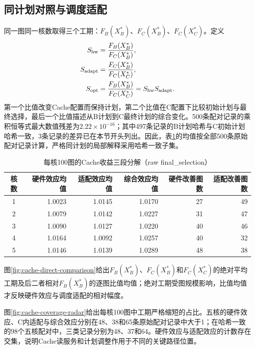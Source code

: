 \subsection{同计划对照与调度适配}
同一图同一核数取得三个工期：$F_B(X_B^*)$、$F_C(X_B^*)$、$F_C(X_C^*)$。定义
\begin{equation}
\begin{split}
S_{\rm hw}&=\frac{F_B(X_B^*)}{F_C(X_B^*)},\\
S_{\rm adapt}&=\frac{F_C(X_B^*)}{F_C(X_C^*)},\\
S_{\rm opt}&=\frac{F_B(X_B^*)}{F_C(X_C^*)}=S_{\rm hw}S_{\rm adapt}.
\end{split}
\label{eq:cache-factors}
\end{equation}
第一个比值改变Cache配置而保持计划，第二个比值在C配置下比较初始计划与最终选择，最后一个比值描述从B计划到C最终计划的综合变化。500条配对记录的乘积恒等式最大数值残差为$2.22\times10^{-16}$；其中497条记录的B计划哈希与C初始计划哈希一致，3条记录的差异已在本节开头列出。因此，表\ref{tab:cache-factors}的均值按全部500条原始配对记录计算，严格同计划的局部解释采用哈希一致子集。
\begin{table}[H]\centering\caption{每核100图的Cache收益三段分解（raw final\_selection）}\label{tab:cache-factors}
\begin{tabular}{crrrrr}\toprule
核数 & 硬件效应均值 & 适配效应均值 & 综合效应均值 & 硬件改善图数 & 适配改善图数\\\midrule
1 & 1.0023 & 1.0145 & 1.0170 & 27 & 49\\
2 & 1.0079 & 1.0142 & 1.0227 & 31 & 47\\
3 & 1.0090 & 1.0127 & 1.0220 & 40 & 46\\
4 & 1.0164 & 1.0092 & 1.0257 & 40 & 32\\
5 & 1.0146 & 1.0139 & 1.0289 & 48 & 38\\\bottomrule
\end{tabular}\end{table}
图\ref{fig:cache-direct-comparison}给出$F_B(X_B^*)$、$F_C(X_B^*)$和$F_C(X_C^*)$的绝对平均工期及后二者相对$F_B(X_B^*)$的逐图比值均值；绝对工期受图规模影响，比值均值才反映硬件效应与调度适配的相对幅度。

图\ref{fig:cache-coverage-radar}给出每核100图中工期严格缩短的占比。五核的硬件效应、C内适配与综合效应分别在48、38和65条原始配对记录中大于1；在哈希一致的98个五核配对中，三类记录分别为48、37和64。硬件效应与适配效应的计数存在交集，说明Cache读服务和计划调整作用于不同的关键路径位置。

